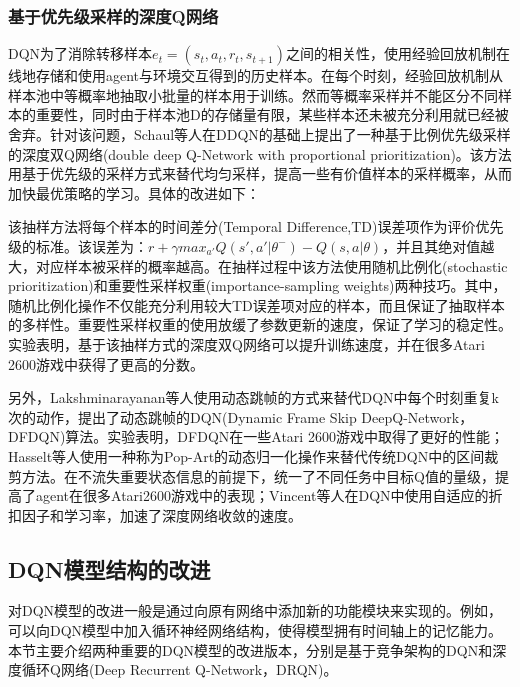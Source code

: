 \documentclass[bachelor]{thesis-uestc}
\begin{document}
	\subsubsection{基于优先级采样的深度Q网络}
	DQN为了消除转移样本$e_t=(s_t,a_t,r_t,s_{t+1})$之间的相关性，使用经验回放机制在线地存储和使用agent与环境交互得到的历史样本。在每个时刻，经验回放机制从样本池中等概率地抽取小批量的样本用于训练。然而等概率采样并不能区分不同样本的重要性，同时由于样本池D的存储量有限，某些样本还未被充分利用就已经被舍弃。针对该问题，Schaul等人在DDQN的基础上提出了一种基于比例优先级采样的深度双Q网络(double deep Q-Network with proportional prioritization)。该方法用基于优先级的采样方式来替代均匀采样，提高一些有价值样本的采样概率，从而加快最优策略的学习。具体的改进如下：

	该抽样方法将每个样本的时间差分(Temporal Difference,TD)误差项作为评价优先级的标准。该误差为：$r+\gamma max_{a'}Q(s',a'|\theta^-)-Q(s,a|\theta)$，并且其绝对值越大，对应样本被采样的概率越高。在抽样过程中该方法使用随机比例化(stochastic prioritization)和重要性采样权重(importance-sampling weights)两种技巧。其中，随机比例化操作不仅能充分利用较大TD误差项对应的样本，而且保证了抽取样本的多样性。重要性采样权重的使用放缓了参数更新的速度，保证了学习的稳定性。实验表明，基于该抽样方式的深度双Q网络可以提升训练速度，并在很多Atari 2600游戏中获得了更高的分数。
	
	另外，Lakshminarayanan等人使用动态跳帧的方式来替代DQN中每个时刻重复k次的动作，提出了动态跳帧的DQN(Dynamic Frame Skip DeepQ-Network，DFDQN)算法。实验表明，DFDQN在一些Atari 2600游戏中取得了更好的性能；Hasselt等人使用一种称为Pop-Art的动态归一化操作来替代传统DQN中的区间裁剪方法。在不流失重要状态信息的前提下，统一了不同任务中目标Q值的量级，提高了agent在很多Atari2600游戏中的表现；Vincent等人在DQN中使用自适应的折扣因子和学习率，加速了深度网络收敛的速度。
	
	\subsection{DQN模型结构的改进}
	对DQN模型的改进一般是通过向原有网络中添加新的功能模块来实现的。例如，可以向DQN模型中加入循环神经网络结构，使得模型拥有时间轴上的记忆能力。本节主要介绍两种重要的DQN模型的改进版本，分别是基于竞争架构的DQN和深度循环Q网络(Deep Recurrent Q-Network，DRQN)。
\end{document}
